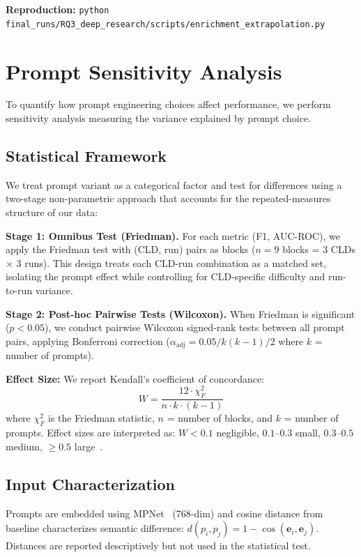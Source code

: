 \textbf{Reproduction:} \texttt{python final\_runs/RQ3\_deep\_research/scripts/enrichment\_extrapolation.py}

\section{Prompt Sensitivity Analysis}

To quantify how prompt engineering choices affect performance, we perform sensitivity analysis measuring the variance explained by prompt choice.

\subsection{Statistical Framework}
We treat prompt variant as a categorical factor and test for differences using a two-stage non-parametric approach that accounts for the repeated-measures structure of our data:

\textbf{Stage 1: Omnibus Test (Friedman).} For each metric (F1, AUC-ROC), we apply the Friedman test with (CLD, run) pairs as blocks ($n=9$ blocks = 3 CLDs $\times$ 3 runs). This design treats each CLD-run combination as a matched set, isolating the prompt effect while controlling for CLD-specific difficulty and run-to-run variance.

\textbf{Stage 2: Post-hoc Pairwise Tests (Wilcoxon).} When Friedman is significant ($p < 0.05$), we conduct pairwise Wilcoxon signed-rank tests between all prompt pairs, applying Bonferroni correction ($\alpha_{\text{adj}} = 0.05 / k(k-1)/2$ where $k$ = number of prompts).

\textbf{Effect Size:} We report Kendall's coefficient of concordance:
\begin{equation}
W = \frac{12 \cdot \chi^2_F}{n \cdot k \cdot (k-1)}
\end{equation}
where $\chi^2_F$ is the Friedman statistic, $n$ = number of blocks, and $k$ = number of prompts. Effect sizes are interpreted as: $W < 0.1$ negligible, $0.1$--$0.3$ small, $0.3$--$0.5$ medium, $\geq 0.5$ large~\cite{landis1977measurement}.

\subsection{Input Characterization}
Prompts are embedded using MPNet~\cite{reimers2019sentencebert} (768-dim) and cosine distance from baseline characterizes semantic difference: $d(p_i, p_j) = 1 - \cos(\mathbf{e}_i, \mathbf{e}_j)$. Distances are reported descriptively but not used in the statistical test.

